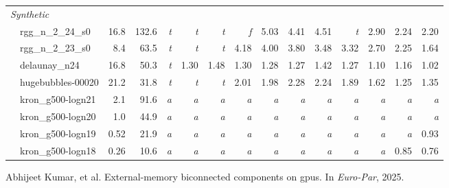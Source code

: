 \documentclass[11pt]{article}
\begin{document}
\begin{table}[t]
\begin{tabular}{lrrrrrrrrrrrrr}
\multicolumn{14}{l}{\emph{Synthetic}} \\
~~rgg\_n\_2\_24\_s0 & 16.8 & 132.6 & \emph{t} & \emph{t} & \emph{t} & \emph{f} & 5.03 & 4.41 & 4.51 & \emph{t} & 2.90 & 2.24 & 2.20 \\
~~rgg\_n\_2\_23\_s0 & 8.4 & 63.5 & \emph{t} & \emph{t} & \emph{t} & 4.18 & 4.00 & 3.80 & 3.48 & 3.32 & 2.70 & 2.25 & 1.64 \\
~~delaunay\_n24 & 16.8 & 50.3 & \emph{t} & 1.30 & 1.48 & 1.30 & 1.28 & 1.27 & 1.42 & 1.27 & 1.10 & 1.16 & 1.02 \\
~~hugebubbles-00020 & 21.2 & 31.8 & \emph{t} & \emph{t} & \emph{t} & 2.01 & 1.98 & 2.28 & 2.24 & 1.89 & 1.62 & 1.25 & 1.35 \\
~~kron\_g500-logn21 & 2.1 & 91.6 & \emph{a} & \emph{a} & \emph{a} & \emph{a} & \emph{a} & \emph{a} & \emph{a} & \emph{a} & \emph{a} & \emph{a} & \emph{a} \\
~~kron\_g500-logn20 & 1.0 & 44.9 & \emph{a} & \emph{a} & \emph{a} & \emph{a} & \emph{a} & \emph{a} & \emph{a} & \emph{a} & \emph{a} & \emph{a} & \emph{a} \\
~~kron\_g500-logn19 & 0.52 & 21.9 & \emph{a} & \emph{a} & \emph{a} & \emph{a} & \emph{a} & \emph{a} & \emph{a} & \emph{a} & \emph{a} & \emph{a} & 0.93 \\
~~kron\_g500-logn18 & 0.26 & 10.6 & \emph{a} & \emph{a} & \emph{a} & \emph{a} & \emph{a} & \emph{a} & \emph{a} & \emph{a} & \emph{a} & 0.85 & 0.76 \\
\bottomrule
\end{tabular}
\end{table}

\begin{thebibliography}{9}
Abhijeet Kumar, et al.
\newblock External-memory biconnected components on gpus.
\newblock In \emph{Euro-Par}, 2025.
\end{thebibliography}
\end{document}

